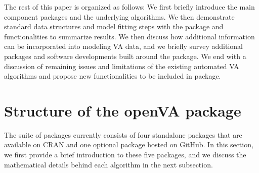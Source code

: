 The rest of this paper is organized as follows: We first briefly
introduce the main component packages and the underlying algorithms. We
then demonstrate standard data structures and model fitting steps with
the  package and functionalities to summarize results.
We then discuss how additional information can be incorporated into
modeling VA data, and we briefly survey additional packages and software
developments built around the  package. We end with a
discussion of remaining issues and limitations of the existing automated
VA algorithms and propose new functionalities to be included in
 package.

\hypertarget{structure-of-the-openva-package}{%
\section{Structure of the openVA
package}\label{structure-of-the-openva-package}}

The  suite of packages currently consists of four
standalone packages that are available on CRAN and one optional package
hosted on GitHub. In this section, we first provide a brief introduction
to these five packages, and we discuss the mathematical details behind
each algorithm in the next subsection.

